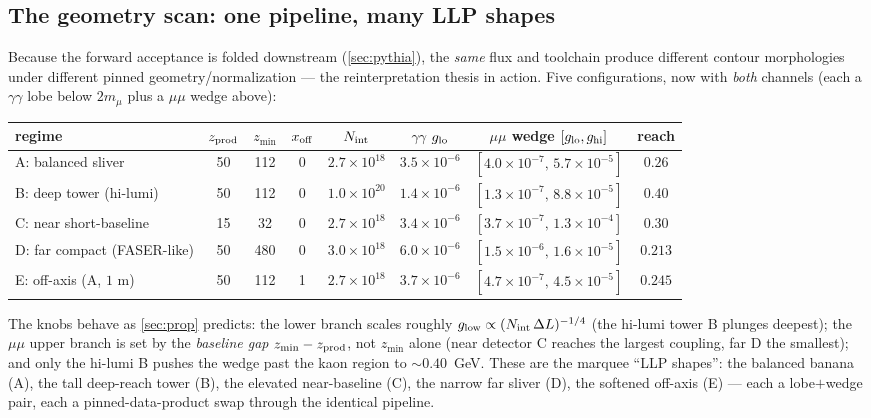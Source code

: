 \documentclass[11pt]{article}
\begin{document}
\subsection{The geometry scan: one pipeline, many LLP shapes}
\label{sec:results:geomscan}

Because the forward acceptance is folded downstream (\cref{sec:pythia}), the
\emph{same} flux and toolchain produce different contour morphologies under
different pinned geometry/normalization --- the reinterpretation thesis in
action. Five configurations, now with \emph{both} channels (each a
$\gamma\gamma$ lobe below $2m_\mu$ plus a $\mu\mu$ wedge above):
\begin{center}\scriptsize
\begin{tabular}{lccccccc}
\toprule
regime & $z_{\rm prod}$ & $z_{\min}$ & $x_{\rm off}$ & $N_{\rm int}$ & $\gamma\gamma$ $g_{\rm lo}$ & $\mu\mu$ wedge $[g_{\rm lo},g_{\rm hi}]$ & reach \\
\midrule
A: balanced sliver          &  50 & 112 & 0 & $2.7{\times}10^{18}$ & $3.5{\times}10^{-6}$ & $[4.0{\times}10^{-7},\,5.7{\times}10^{-5}]$ & $0.26$ \\
B: deep tower (hi-lumi)     &  50 & 112 & 0 & $1.0{\times}10^{20}$ & $1.4{\times}10^{-6}$ & $[1.3{\times}10^{-7},\,8.8{\times}10^{-5}]$ & $0.40$ \\
C: near short-baseline      &  15 &  32 & 0 & $2.7{\times}10^{18}$ & $3.4{\times}10^{-6}$ & $[3.7{\times}10^{-7},\,1.3{\times}10^{-4}]$ & $0.30$ \\
D: far compact (FASER-like) &  50 & 480 & 0 & $3.0{\times}10^{18}$ & $6.0{\times}10^{-6}$ & $[1.5{\times}10^{-6},\,1.6{\times}10^{-5}]$ & $0.213$ \\
E: off-axis (A, $1$ m)      &  50 & 112 & 1 & $2.7{\times}10^{18}$ & $3.7{\times}10^{-6}$ & $[4.7{\times}10^{-7},\,4.5{\times}10^{-5}]$ & $0.245$ \\
\bottomrule
\end{tabular}
\end{center}
The knobs behave as \cref{sec:prop} predicts: the lower branch scales roughly
$g_{\rm low}\propto(N_{\rm int}\,\Delta L)^{-1/4}$ (the hi-lumi tower B plunges
deepest); the $\mu\mu$ upper branch is set by the \emph{baseline gap}
$z_{\min}-z_{\rm prod}$, not $z_{\min}$ alone (near detector C reaches the largest
coupling, far D the smallest); and only the hi-lumi B pushes the wedge past the
kaon region to $\sim\!0.40$~GeV. These are the marquee ``LLP shapes'': the
balanced banana (A), the tall deep-reach tower (B), the elevated near-baseline
(C), the narrow far sliver (D), the softened off-axis (E) --- each a lobe$+$wedge
pair, each a pinned-data-product swap through the identical pipeline.
\end{document}
